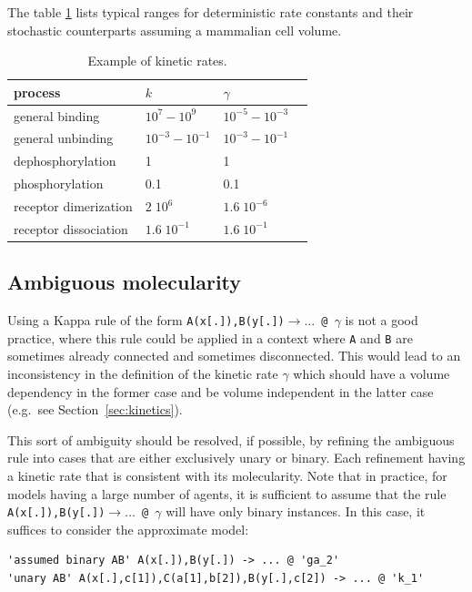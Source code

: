 \documentclass[11pt]{book}
\def\ttt#1{\texttt{#1}}
\def\rar{\rightarrow}
\def\ga{\gamma}
\def\eg{e.g.~}
\begin{document}
The table \ref{tab:kin_rates} lists typical ranges for deterministic
rate constants and their stochastic counterparts assuming a mammalian
cell volume.

\begin{table}[htbp]
\centering
\caption{Example of kinetic rates.}
\label{tab:kin_rates}
\begin{tabular}{@{} lllr @{} }
\toprule
process & $k$ & $\gamma$ %
\\
\midrule
general binding & $10^{7}-10^{9}$ & $10^{-5}-10^{-3}$ %
\\
general unbinding &  $10^{-3} - 10^{-1}$ & $10^{-3}-10^{-1}$ %
\\
dephosphorylation & 1 & 1 %
\\
phosphorylation & 0.1 & 0.1 %
\\
receptor dimerization & $2\; 10^{6}$ & $1.6 \;10^{-6}$ %
\\
receptor dissociation & $1.6\; 10^{-1}$ & $1.6\; 10^{-1}$ %
\\
\bottomrule
\end{tabular}
\end{table}

\subsection{Ambiguous molecularity}\label{sec:ambiguous}

Using a Kappa rule of the form \ttt{A(x[.]),B(y[.])$\rar \dots$ @
  $\ga$} is not a good practice, where this rule could be applied in a
context where \ttt{A} and \ttt{B} are sometimes already connected and
sometimes disconnected. This would lead to an inconsistency in the
definition of the kinetic rate $\ga$ which should have a volume
dependency in the former case and be volume independent in the latter
case ({\eg}see Section~\ref{sec:kinetics}).

This sort of ambiguity should be resolved, if possible, by refining
the ambiguous rule into cases that are either exclusively unary or
binary. Each refinement having a kinetic rate that is consistent with
its molecularity. Note that in practice, for models having a large
number of agents, it is sufficient to assume that the rule
\ttt{A(x[.]),B(y[.])$\rar \dots$ @ $\ga$} will have only binary
instances. In this case, it suffices to consider the approximate model:
\begin{lstlisting}[language=kappa]
'assumed binary AB' A(x[.]),B(y[.]) -> ... @ 'ga_2'
'unary AB' A(x[.],c[1]),C(a[1],b[2]),B(y[.],c[2]) -> ... @ 'k_1'
\end{lstlisting}
\end{document}
